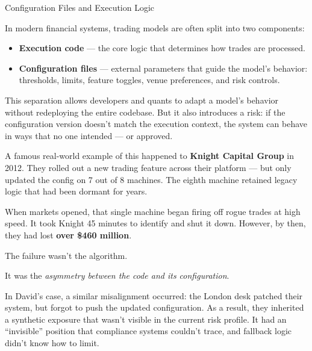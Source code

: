 \begin{TechnicalSidebar}{Configuration Files and Execution Logic}

  In modern financial systems, trading models are often split into two components:

  \begin{itemize}
    \item \textbf{Execution code} — the core logic that determines how trades are processed.
    \item \textbf{Configuration files} — external parameters that guide the model’s behavior: thresholds, 
    limits, feature toggles, venue preferences, and risk controls.
  \end{itemize}

  This separation allows developers and quants to adapt a model’s behavior without redeploying the entire 
  codebase. But it also introduces a risk: if the configuration version doesn’t match the execution context, 
  the system can behave in ways that no one intended — or approved.

  \medskip

  A famous real-world example of this happened to \textbf{Knight Capital Group} in 2012. They rolled out a new 
  trading feature across their platform — but only updated the config on 7 out of 8 machines. The eighth machine 
  retained legacy logic that had been dormant for years. 

  \medskip

  When markets opened, that single machine began firing off rogue trades at high speed. It took Knight 45 minutes 
  to identify and shut it down. However, by then, they had lost \textbf{over \$460 million}.

  \medskip

  The failure wasn’t the algorithm.

  \medskip

  It was the \textit{asymmetry between the code and its configuration}.

  \medskip

  In David’s case, a similar misalignment occurred: the London desk patched their system, but forgot to push the 
  updated configuration. As a result, they inherited a synthetic exposure that wasn’t visible in the current risk 
  profile. It had an ``invisible'' position that compliance systems couldn’t trace, and fallback logic didn’t 
  know how to limit.

\end{TechnicalSidebar}

